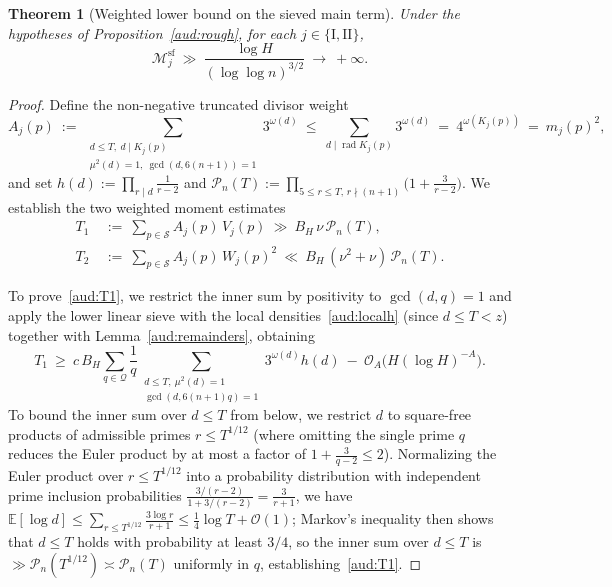 \documentclass[11pt, a4paper]{article}
\theoremstyle{plain}
\newtheorem{theorem}{Theorem}[section]
\theoremstyle{definition}
\newcommand{\Ebb}{\mathbb{E}}
\newcommand{\I}{\mathrm{I}}
\newcommand{\II}{\mathrm{II}}
\newcommand{\sfm}{\mathrm{sf}}
\DeclareMathOperator{\rad}{rad}
\begin{document}
\begin{theorem}[Weighted lower bound on the sieved main term]\label{aud:weightedmain}
Under the hypotheses of Proposition~\ref{aud:rough}, for each $j\in\{\I,\II\}$,
\begin{equation}\label{aud:weightedmaineq}
\mathcal{M}_j^{\sfm}\ \gg\ \frac{\log H}{(\log\log n)^{3/2}}\ \longrightarrow\ +\infty.
\end{equation}
\end{theorem}
\begin{proof}
Define the non-negative truncated divisor weight
\begin{equation}\label{aud:Aweight}
A_j(p)\ :=\ \sum_{\substack{d\le T,\ d\mid K_j(p)\\ \mu^{2}(d)=1,\ \gcd(d,6(n+1))=1}}3^{\omega(d)}\ \le\ \sum_{d\mid\rad K_j(p)}3^{\omega(d)}\ =\ 4^{\omega(K_j(p))}\ =\ m_j(p)^{2},
\end{equation}
and set $h(d):=\prod_{r\mid d}\frac{1}{r-2}$ and $\mathcal{P}_n(T):=\prod_{5\le r\le T,\,r\nmid(n+1)}\big(1+\frac{3}{r-2}\big)$. We establish the two weighted moment estimates
\begin{align}
T_1\ &:=\ \sum_{p\in\mathcal{S}}A_j(p)\,V_j(p)\ \gg\ B_H\,\nu\,\mathcal{P}_n(T),\label{aud:T1}\\
T_2\ &:=\ \sum_{p\in\mathcal{S}}A_j(p)\,W_j(p)^{2}\ \ll\ B_H\,(\nu^{2}+\nu)\,\mathcal{P}_n(T).\label{aud:T2}
\end{align}

To prove~\eqref{aud:T1}, we restrict the inner sum by positivity to $\gcd(d,q)=1$ and apply the lower linear sieve with the local densities~\eqref{aud:localh} (since $d\le T<z$) together with Lemma~\ref{aud:remainders}, obtaining
\begin{equation}\label{aud:T1local}
T_1\ \ge\ c\,B_H\sum_{q\in\mathcal{Q}}\frac1q\sum_{\substack{d\le T,\ \mu^{2}(d)=1\\ \gcd(d,6(n+1)q)=1}}3^{\omega(d)}h(d)\ -\ \mathcal{O}_A\big(H(\log H)^{-A}\big).
\end{equation}
To bound the inner sum over $d\le T$ from below, we restrict $d$ to square-free products of admissible primes $r\le T^{1/12}$ (where omitting the single prime $q$ reduces the Euler product by at most a factor of $1+\frac{3}{q-2}\le 2$). Normalizing the Euler product over $r\le T^{1/12}$ into a probability distribution with independent prime inclusion probabilities $\frac{3/(r-2)}{1+3/(r-2)}=\frac{3}{r+1}$, we have $\Ebb[\log d]\le\sum_{r\le T^{1/12}}\frac{3\log r}{r+1}\le\frac14\log T+\mathcal{O}(1)$; Markov's inequality then shows that $d\le T$ holds with probability at least $3/4$, so the inner sum over $d\le T$ is $\gg\mathcal{P}_n(T^{1/12})\asymp\mathcal{P}_n(T)$ uniformly in $q$, establishing~\eqref{aud:T1}.


\end{proof}
\end{document}

